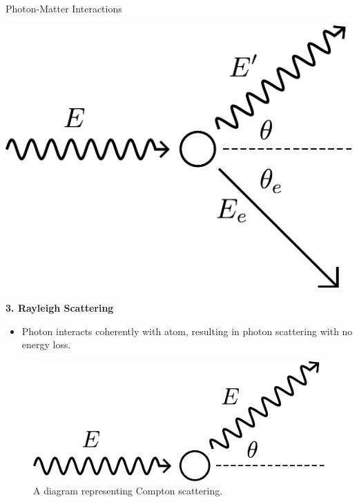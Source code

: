 \documentclass[final]{beamer}
\newlength{\colwidth}
\begin{document}
\begin{frame}[t]
\begin{columns}[t]
\begin{column}{\colwidth}
\begin{block}{Photon-Matter Interactions}
\begin{multicols}{2}
      \begin{center}
        \includegraphics[width = 0.8\linewidth]{compton_diagram.pdf}
      \end{center}

    \end{multicols}

    \begin{center}
      \textbf{3. Rayleigh Scattering}
      \begin{itemize}[label=\textbullet]
        \item Photon interacts coherently with atom, resulting in photon scattering with no energy loss.
      \end{itemize}
      \vspace{-1\baselineskip}
      \begin{figure}
        \includegraphics[width = 0.4\colwidth]{rayleigh_diagram.pdf}
        \caption{A diagram representing Compton scattering.}
      \end{figure}
    \end{center}
    \vspace{-\baselineskip}
  \end{block}


\end{column}
\end{columns}
\end{frame}
\end{document}
